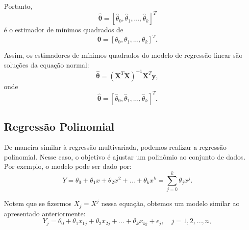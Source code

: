 \documentclass{article}
\begin{document}
Portanto, 
    $$
    \hat{\boldsymbol{\theta}} = [\hat{\theta}_0, \hat{\theta}_1, \ldots, \hat{\theta}_k]^T
    $$ 
é o estimador de mínimos quadrados de 
    $$
    \boldsymbol{\theta} = [\theta_0, \theta_1, \ldots, \theta_k]^T.
    $$

Assim, os estimadores de mínimos quadrados do modelo de regressão linear são soluções da equação normal:
    $$
    \hat{\boldsymbol{\theta}} = (\mathbf{X}^T\mathbf{X})^{-1}\mathbf{X}^T\mathbf{y},
    $$
onde 
    $$
    \hat{\boldsymbol{\theta}} = [\hat{\theta}_0, \hat{\theta}_1, \ldots, \hat{\theta}_k]^T.
    $$
    
\subsection{Regressão Polinomial}
De maneira similar à regressão multivariada, podemos realizar a regressão polinomial. Nesse caso, o objetivo é ajustar um polinômio ao conjunto de dados. Por exemplo, o modelo pode ser dado por:
    $$
    Y = \theta_0 + \theta_1 x + \theta_2 x^2 + \ldots + \theta_k x^k = \sum_{j=0}^{k} \theta_j x^j.
    $$

Notem que se fizermos $X_j = X^j$ nessa equação, obtemos um modelo similar ao apresentado anteriormente:
    $$
    Y_j = \theta_0 + \theta_1 x_{1j} + \theta_2 x_{2j} + \ldots + \theta_k x_{kj} + \epsilon_j, \quad j = 1, 2, \ldots, n,
    $$
\end{document}
